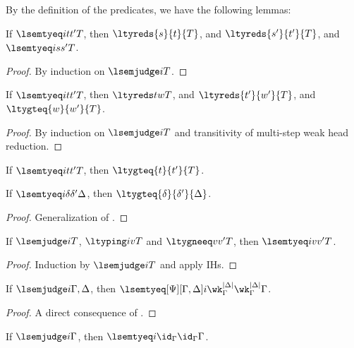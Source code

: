 By the definition of the predicates, we have the following lemmas:
\begin{lemma}
  If $\lsemtyeq i {t}{t'} T$, then $\ltyreds {s}{t}{T}$, and $\ltyreds{s'}{t'}{T}$, and
  $\lsemtyeq i{s}{s'}{T}$.
\end{lemma}
\begin{proof}
  By induction on $\lsemjudge i T$. 
\end{proof}
\begin{lemma}
  If $\lsemtyeq i {t}{t'} T$, then $\ltyreds t w {T}$, and $\ltyreds{t'}{w'}{T}$, and
  $\ltygteq{w}{w'}{T}$.
\end{lemma}
\begin{proof}
  By induction on $\lsemjudge i T$ and transitivity of multi-step weak head
  reduction. 
\end{proof}
\begin{corollary}
  If $\lsemtyeq i {t}{t'} T$, then $\ltygteq{t}{t'}{T}$.
\end{corollary}
\begin{lemma}
  If $\lsemtyeq i {\delta}{\delta'} \Delta$, then
  $\ltygteq{\delta}{\delta'}{\Delta}$. 
\end{lemma}
\begin{proof}
  Generalization of . 
\end{proof}

\begin{lemma}
  If $\lsemjudge i T$, $\ltyping i v T$ and $\ltygneeq v {v'} T$, then $\lsemtyeq i v {v'} T$. 
\end{lemma}
\begin{proof}
  Induction by $\lsemjudge i T$ and apply IHs. 
\end{proof}
\begin{lemma}
  If $\lsemjudge i \Gamma,\Delta$, then $\lsemtyeq[\Psi][\Gamma,\Delta]i {\wk^{|\Delta|}_{\Gamma}}{\wk^{|\Delta|}_{\Gamma}}{\Gamma}$.
\end{lemma}
\begin{proof}
  A direct consequence of .
\end{proof}
\begin{corollary}
  If $\lsemjudge i \Gamma$, then $\lsemtyeq i {\id_{\Gamma}}{\id_{\Gamma}}{\Gamma}$.  
\end{corollary}

